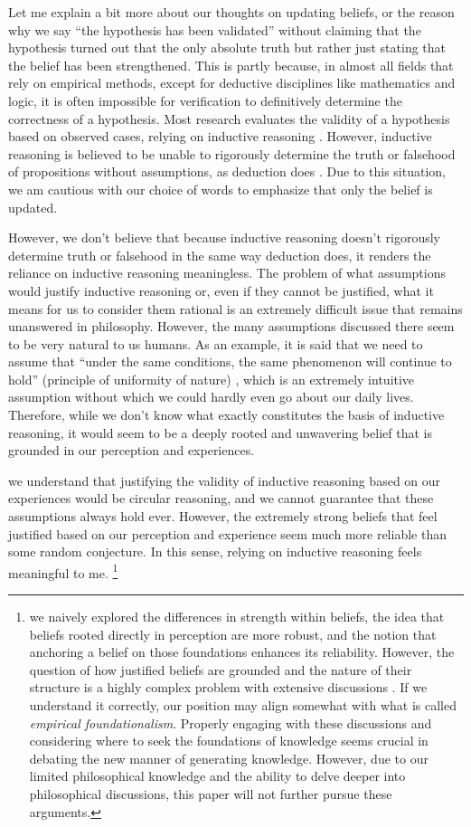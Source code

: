 \documentclass{book}
\begin{document}
Let me explain a bit more about our thoughts on updating beliefs, or the reason why we say ``the hypothesis has been validated'' without claiming that the hypothesis turned out that the only absolute truth but rather just stating that the belief has been strengthened. This is partly because, in almost all fields that rely on empirical methods, except for deductive disciplines like mathematics and logic, it is often impossible for verification to definitively determine the correctness of a hypothesis. Most research evaluates the validity of a hypothesis based on observed cases, relying on inductive reasoning \cite{sep-scientific-method}. However, inductive reasoning is believed to be unable to rigorously determine the truth or falsehood of propositions without assumptions, as deduction does \cite{sep-induction-problem}. Due to this situation, we am cautious with our choice of words to emphasize that only the belief is updated.

However, we don't believe that because inductive reasoning doesn't rigorously determine truth or falsehood in the same way deduction does, it renders the reliance on inductive reasoning meaningless. The problem of what assumptions would justify inductive reasoning or, even if they cannot be justified, what it means for us to consider them rational is an extremely difficult issue that remains unanswered in philosophy. However, the many assumptions discussed there seem to be very natural to us humans. As an example, it is said that we need to assume that ``under the same conditions, the same phenomenon will continue to hold'' (principle of uniformity of nature) \cite{sep-induction-problem}, which is an extremely intuitive assumption without which we could hardly even go about our daily lives. Therefore, while we don't know what exactly constitutes the basis of inductive reasoning, it would seem to be a deeply rooted and unwavering belief that is grounded in our perception and experiences.

we understand that justifying the validity of inductive reasoning based on our experiences would be circular reasoning, and we cannot guarantee that these assumptions always hold ever. However, the extremely strong beliefs that feel justified based on our perception and experience seem much more reliable than some random conjecture. In this sense, relying on inductive reasoning feels meaningful to me. \footnote{we naively explored the differences in strength within beliefs, the idea that beliefs rooted directly in perception are more robust, and the notion that anchoring a belief on those foundations enhances its reliability. However, the question of how justified beliefs are grounded and the nature of their structure is a highly complex problem with extensive discussions  \cite{sep-epistemology}. If we understand it correctly, our position may align somewhat with what is called \textit{empirical foundationalism}. Properly engaging with these discussions and considering where to seek the foundations of knowledge seems crucial in debating the new manner of generating knowledge. However, due to our limited philosophical knowledge and the ability to delve deeper into philosophical discussions, this paper will not further pursue these arguments.}
\end{document}
